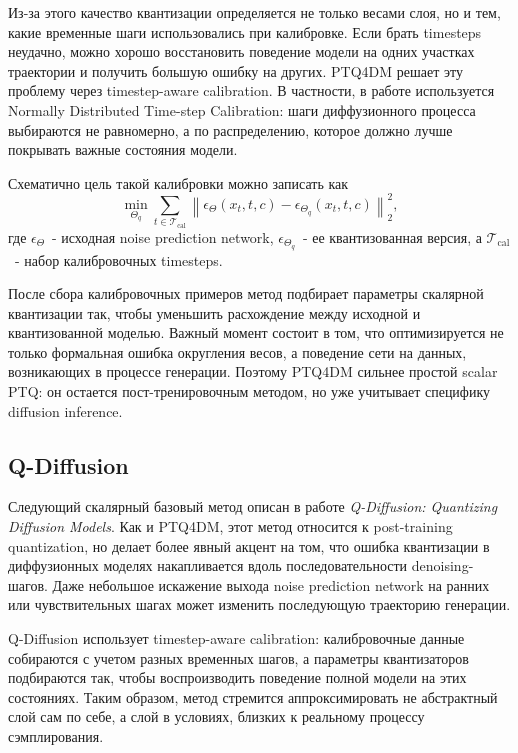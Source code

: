 \documentclass[a4paper,12pt]{article}
\begin{document}
Из-за этого качество квантизации определяется не только весами слоя, но и тем, какие временные шаги использовались при калибровке. Если брать timesteps неудачно, можно хорошо восстановить поведение модели на одних участках траектории и получить большую ошибку на других. PTQ4DM решает эту проблему через timestep-aware calibration. В частности, в работе используется Normally Distributed Time-step Calibration: шаги диффузионного процесса выбираются не равномерно, а по распределению, которое должно лучше покрывать важные состояния модели.

Схематично цель такой калибровки можно записать как
\[
    \min_{\Theta_q}
    \sum_{t \in \mathcal{T}_{\mathrm{cal}}}
    \left\|
        \epsilon_{\Theta}(x_t, t, c) -
        \epsilon_{\Theta_q}(x_t, t, c)
    \right\|_2^2,
\]
где $\epsilon_{\Theta}$~- исходная noise prediction network, $\epsilon_{\Theta_q}$~- ее квантизованная версия, а $\mathcal{T}_{\mathrm{cal}}$~- набор калибровочных timesteps.

После сбора калибровочных примеров метод подбирает параметры скалярной квантизации так, чтобы уменьшить расхождение между исходной и квантизованной моделью. Важный момент состоит в том, что оптимизируется не только формальная ошибка округления весов, а поведение сети на данных, возникающих в процессе генерации. Поэтому PTQ4DM сильнее простой scalar PTQ: он остается пост-тренировочным методом, но уже учитывает специфику diffusion inference.

\subsection{Q-Diffusion}

Следующий скалярный базовый метод описан в работе \textit{Q-Diffusion: Quantizing Diffusion Models}. Как и PTQ4DM, этот метод относится к post-training quantization, но делает более явный акцент на том, что ошибка квантизации в диффузионных моделях накапливается вдоль последовательности denoising-шагов. Даже небольшое искажение выхода noise prediction network на ранних или чувствительных шагах может изменить последующую траекторию генерации.

Q-Diffusion использует timestep-aware calibration: калибровочные данные собираются с учетом разных временных шагов, а параметры квантизаторов подбираются так, чтобы воспроизводить поведение полной модели на этих состояниях. Таким образом, метод стремится аппроксимировать не абстрактный слой сам по себе, а слой в условиях, близких к реальному процессу сэмплирования.
\end{document}
